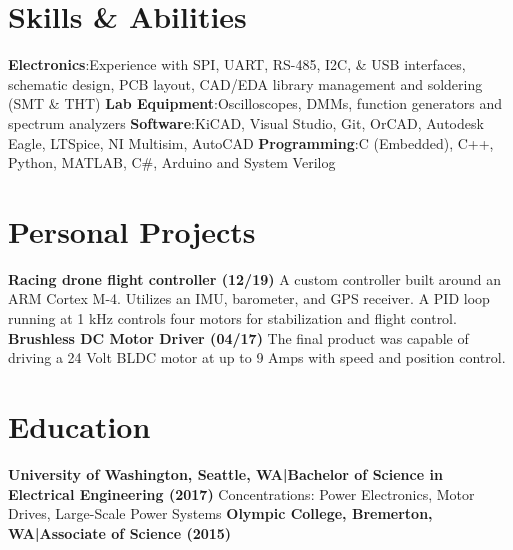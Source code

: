\documentclass[]{article}
\begin{document}
\section*{Skills \& Abilities}

\textbf{Electronics}:\newline Experience with SPI, UART, RS-485, I2C, \& USB interfaces, schematic design, PCB layout,
CAD/EDA library management and soldering (SMT \& THT)
\newline\textbf{Lab Equipment}:\newline Oscilloscopes, DMMs, function generators and spectrum analyzers
\newline\textbf{Software}:\newline KiCAD, Visual Studio, Git, OrCAD, Autodesk Eagle, LTSpice, NI Multisim, AutoCAD
\newline\textbf{Programming}:\newline C (Embedded), C++, Python, MATLAB, C\#, Arduino and System Verilog



\section*{Personal Projects}

\textbf{Racing drone flight controller (12/19)}\newline
A custom controller built around an ARM Cortex M-4. Utilizes an IMU, barometer, and GPS receiver. A PID loop
running at 1 kHz controls four motors for stabilization and flight control.
\newline\newline\textbf{Brushless DC Motor Driver (04/17)}\newline
The final product was capable of driving a 24 Volt BLDC motor at up to 9 Amps with speed and position control.



\section*{Education}

\textbf{University of Washington, Seattle, WA\hspace{3 mm}|\hspace{3 mm}Bachelor of Science in Electrical Engineering (2017)}
\newline Concentrations: Power Electronics, Motor Drives, Large-Scale Power Systems
\newline\break\textbf{Olympic College, Bremerton, WA\hspace{3 mm}|\hspace{3 mm}Associate of Science (2015)}
\end{document}
